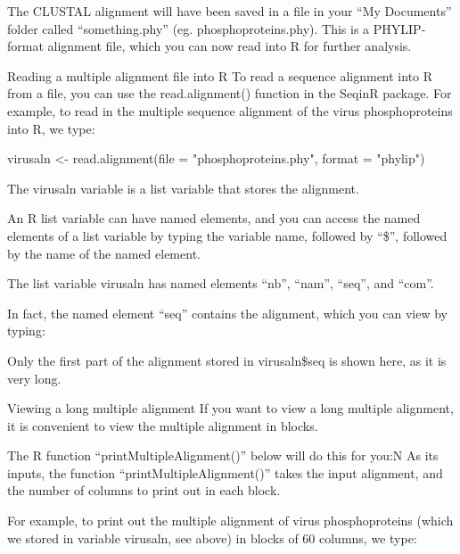 \documentclass[
]{book}
\newenvironment{Shaded}{\begin{snugshade}}{\end{snugshade}}
\newcommand{\AttributeTok}[1]{\textcolor[rgb]{0.77,0.63,0.00}{#1}}
\newcommand{\FunctionTok}[1]{\textcolor[rgb]{0.00,0.00,0.00}{#1}}
\newcommand{\NormalTok}[1]{#1}
\newcommand{\OtherTok}[1]{\textcolor[rgb]{0.56,0.35,0.01}{#1}}
\newcommand{\SpecialCharTok}[1]{\textcolor[rgb]{0.00,0.00,0.00}{#1}}
\newcommand{\StringTok}[1]{\textcolor[rgb]{0.31,0.60,0.02}{#1}}
\begin{document}
The CLUSTAL alignment will have been saved in a file in your ``My Documents'' folder called ``something.phy'' (eg. phosphoproteins.phy). This is a PHYLIP-format alignment file, which you can now read into R for further analysis.

Reading a multiple alignment file into R
To read a sequence alignment into R from a file, you can use the read.alignment() function in the SeqinR package. For example, to read in the multiple sequence alignment of the virus phosphoproteins into R, we type:

\begin{Shaded}
\begin{Highlighting}[]
\NormalTok{virusaln  }\OtherTok{\textless{}{-}} \FunctionTok{read.alignment}\NormalTok{(}\AttributeTok{file =} \StringTok{"phosphoproteins.phy"}\NormalTok{, }\AttributeTok{format =} \StringTok{"phylip"}\NormalTok{)}
\end{Highlighting}
\end{Shaded}

The virusaln variable is a list variable that stores the alignment.

An R list variable can have named elements, and you can access the named elements of a list variable by typing the variable name, followed by ``\$'', followed by the name of the named element.

The list variable virusaln has named elements ``nb'', ``nam'', ``seq'', and ``com''.

In fact, the named element ``seq'' contains the alignment, which you can view by typing:

\begin{Shaded}
\end{Shaded}

Only the first part of the alignment stored in virusaln\$seq is shown here, as it is very long.

Viewing a long multiple alignment
If you want to view a long multiple alignment, it is convenient to view the multiple alignment in blocks.

The R function ``printMultipleAlignment()'' below will do this for you:N
As its inputs, the function ``printMultipleAlignment()'' takes the input alignment, and the number of columns to print out in each block.

For example, to print out the multiple alignment of virus phosphoproteins (which we stored in variable virusaln, see above) in blocks of 60 columns, we type:
\end{document}
